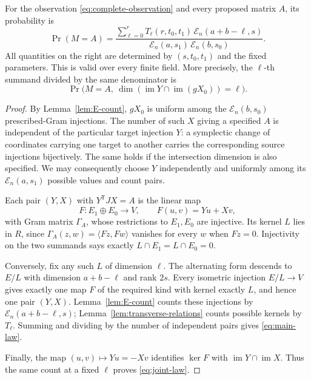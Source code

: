 \begin{theorem}\label{thm:complete-law}
For the observation \eqref{eq:complete-observation} and every proposed
matrix $A$, its probability is
\begin{equation}\label{eq:main-law}
 \boxed{\displaystyle
 \Pr(M=A)=
 \frac{\displaystyle\sum_{\ell=0}^{r}
 T_\ell(r,t_0,t_1)\,\mathcal E_n(a+b-\ell,s)}
 {\mathcal E_n(a,s_1)\,\mathcal E_n(b,s_0)}.}
\end{equation}
All quantities on the right are determined by $(s,t_0,t_1)$ and the
fixed parameters. This is valid over every finite field.
More precisely, the $\ell$-th summand divided by the same denominator
is
\begin{equation}\label{eq:joint-law}
 \Pr\bigl(M=A,\ \dim(\operatorname{im}Y\cap
 \operatorname{im}(gX_0))=\ell\bigr).
\end{equation}
\end{theorem}

\begin{proof}
By Lemma~\ref{lem:E-count}, $gX_0$ is uniform among the
$\mathcal E_n(b,s_0)$ prescribed-Gram injections. The number of
such $X$ giving a specified $A$ is independent of the particular
target injection $Y$: a symplectic change of coordinates carrying
one target to another carries the corresponding source injections
bijectively. The same holds if the intersection dimension is also
specified. We may consequently choose $Y$ independently and uniformly
among its $\mathcal E_n(a,s_1)$ possible values and count pairs.

Each pair $(Y,X)$ with $Y^{\mathsf T}JX=A$ is the linear map
\[
 F:E_1\oplus E_0\longrightarrow V,\qquad F(u,v)=Yu+Xv,
\]
with Gram matrix $\Gamma_A$, whose restrictions to $E_1,E_0$ are
injective. Its kernel $L$ lies in $R$, since
$\Gamma_A(z,w)=\langle Fz,Fw\rangle$ vanishes for every $w$ when
$Fz=0$. Injectivity on the two summands says exactly
$L\cap E_1=L\cap E_0=0$.

Conversely, fix any such $L$ of dimension $\ell$. The alternating
form descends to $E/L$ with dimension $a+b-\ell$ and rank $2s$.
Every isometric injection $E/L\longrightarrow V$ gives exactly one
map $F$ of the required kind with kernel exactly $L$, and hence one
pair $(Y,X)$. Lemma~\ref{lem:E-count} counts these injections by
$\mathcal E_n(a+b-\ell,s)$; Lemma~\ref{lem:transverse-relations}
counts possible kernels by $T_\ell$. Summing and dividing by the
number of independent pairs gives \eqref{eq:main-law}.

Finally, the map $(u,v)\mapsto Yu=-Xv$ identifies $\ker F$ with
$\operatorname{im}Y\cap\operatorname{im}X$. Thus the same count
at a fixed $\ell$ proves \eqref{eq:joint-law}.
\end{proof}

